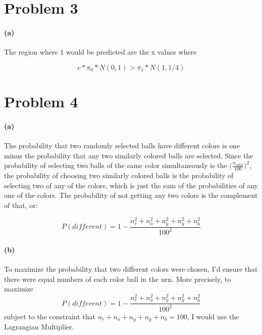 \documentclass[12pt]{article}
\begin{document}
\section{Problem 3}\label{previous work}
\paragraph{(a)} The region where 1 would be predicted are the x values where

$$ c * \pi_0 * N(0, 1) > \pi_1 * N(1, 1/4) $$ 


\section{Problem 4}\label{results}
\paragraph{(a)} The probability that two randomly selected balls have different colors is one minus the probability that any two similarly colored balls are selected. Since the probability of selecting two balls of the same color simultaneously is the $\big(\frac{n_{color}}{100}\big)^2$, the probability of choosing two similarly colored balls is the probability of selecting two of any of the colors, which is just the sum of the probabilities of any one of the colors. The probability of not getting any two colors is the complement of that, or:

$$ P(different) = 1 - \frac{n_r^2 + n_o^2 + n_y^2 + n_g^2 + n_b^2}{100^2}  $$

\paragraph{(b)} To maximize the probability that two different colors were chosen, I'd ensure that there were equal numbers of each color ball in the urn. More precisely, to maximize $$ P(different) = 1 - \frac{n_r^2 + n_o^2 + n_y^2 + n_g^2 + n_b^2}{100^2}  $$ subject to the constraint that $n_r + n_o + n_y + n_g + n_b = 100 $, I would use the Lagrangian Multiplier.
\end{document}
